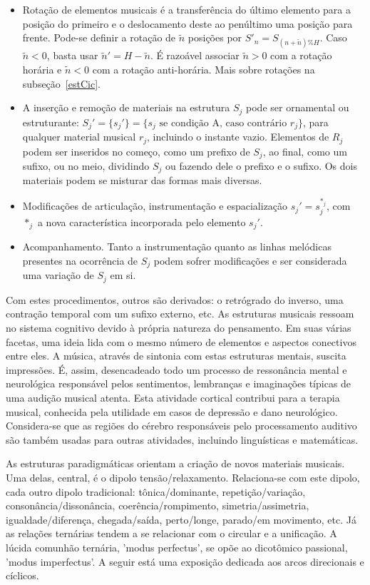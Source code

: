\begin{itemize}
    \item Rotação de elementos musicais é a transferência do último elemento para a posição do primeiro e o deslocamento deste ao penúltimo uma posição para frente. Pode-se definir a rotação de $\tilde{n}$ posições por $S'_n=S_{(n+\tilde{n})\%H}$. Caso $\tilde{n}<0$, basta usar $\tilde{n}'=H-\tilde{n}$. É razoável associar $\tilde{n}>0$ com a rotação horária e $\tilde{n}<0$ com a rotação anti-horária. Mais sobre rotações na subseção~\ref{estCic}.
    \item A inserção e remoção de materiais na estrutura $S_j$ pode ser ornamental ou estruturante: $S_j'=\{s_j'\}=\{s_j \text{ se condição A, caso contrário } r_j\}$, para qualquer material musical $r_j$, incluindo o instante vazio. Elementos de $R_j$ podem ser inseridos no começo, como um prefixo de $S_j$, ao final, como um sufixo, ou no meio, dividindo $S_j$ ou fazendo dele o prefixo e o sufixo. Os dois materiais podem se misturar das formas mais diversas.
    \item Modificações de articulação, instrumentação e espacialização $s_j'=s_j^{*_j}$, com $*_j$ a nova característica incorporada pelo elemento $s_j'$.
    \item Acompanhamento. Tanto a instrumentação quanto as linhas melódicas presentes na ocorrência de $S_j$ podem sofrer modificações e ser considerada uma variação de $S_j$ em si.
\end{itemize}

Com estes procedimentos, outros são derivados: o retrógrado do inverso, uma contração temporal com um sufixo externo, etc.
As estruturas musicais ressoam no sistema cognitivo devido à própria natureza do pensamento. Em suas várias facetas,
uma ideia lida com o mesmo número de elementos e aspectos conectivos entre eles.
A música, através de sintonia com estas estruturas mentais, suscita impressões. É, assim, desencadeado
todo um processo de ressonância mental e neurológica responsável pelos sentimentos, lembranças e imaginações
típicas de uma audição musical atenta. Esta atividade cortical contribui para a terapia
musical, conhecida pela utilidade em casos de depressão e dano neurológico. Considera-se que as regiões do cérebro responsáveis pelo processamento auditivo são também usadas para outras atividades, incluindo linguísticas e matemáticas.\cite{Sacks,Roederer}

As estruturas paradigmáticas orientam a criação de novos materiais musicais. Uma delas, central, é o dipolo tensão/relaxamento. Relaciona-se com este dipolo, cada outro dipolo tradicional: tônica/dominante, repetição/variação, consonância/dissonância, coerência/rompimento, simetria/assimetria, igualdade/diferença, chegada/saída, perto/longe, parado/em movimento, etc. Já as relações ternárias tendem a se relacionar com o circular e a unificação. A lúcida comunhão ternária, 'modus perfectus', se opõe ao dicotômico passional, 'modus imperfectus'.
A seguir está uma exposição  dedicada aos arcos direcionais 
e cíclicos.


